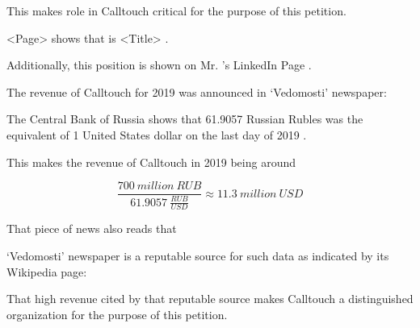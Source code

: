 This makes \mrls role in Calltouch critical for the purpose of this petition.



<Page> shows that \MrCalltouch is <Title>
.

Additionally, this position is shown on Mr. \MrCalltouch's LinkedIn Page .



The revenue of Calltouch for 2019 was announced in `Vedomosti' newspaper:


The Central Bank of Russia shows that
61.9057 Russian Rubles was the equivalent of 1 United States dollar on the last day of 2019
.

This makes the revenue of Calltouch in 2019 being around

\[
    \frac{700\:million\:RUB}{61.9057\:\frac{RUB}{USD}} \approx 11.3\:million\:USD
\]

That piece of news also reads that


`Vedomosti' newspaper is a reputable source for such data as indicated by its Wikipedia page:


That high revenue cited by that reputable source makes Calltouch a distinguished organization
for the purpose of this petition.
